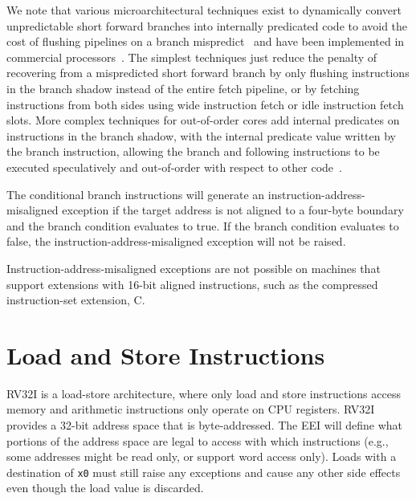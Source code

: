 \begin{commentary}
We note that various microarchitectural techniques exist to
dynamically convert unpredictable short forward branches into
internally predicated code to avoid the cost of flushing pipelines on
a branch mispredict~\cite{heil-tr1996,Klauser-1998,Kim-micro2005} and
have been implemented in commercial processors~\cite{ibmpower7}.
The simplest techniques just reduce the penalty of recovering from a
mispredicted short forward branch by only flushing instructions in the
branch shadow instead of the entire fetch pipeline, or by fetching
instructions from both sides using wide instruction fetch or idle
instruction fetch slots.  More complex techniques for out-of-order
cores add internal predicates on instructions in the branch shadow,
with the internal predicate value written by the branch instruction,
allowing the branch and following instructions to be executed
speculatively and out-of-order with respect to other code~\cite{ibmpower7}.
\end{commentary}

The conditional branch instructions will generate an
instruction-address-misaligned exception if the target address is not
aligned to a four-byte boundary and the branch condition evaluates
to true.  If the branch condition evaluates to false, the
instruction-address-misaligned exception will not be raised.

\begin{commentary}
Instruction-address-misaligned exceptions are not possible on machines
that support extensions with 16-bit aligned instructions, such as the
compressed instruction-set extension, C.
\end{commentary}

\section{Load and Store Instructions}

RV32I is a load-store architecture, where only load and store
instructions access memory and arithmetic instructions only operate on
CPU registers.  RV32I provides a 32-bit address space that is
byte-addressed.
The EEI will define what portions of the address space are legal to access with
which instructions (e.g., some addresses might be read only, or
support word access only).  Loads with a destination of {\tt x0} must
still raise any exceptions and cause any other side effects even
though the load value is discarded.

